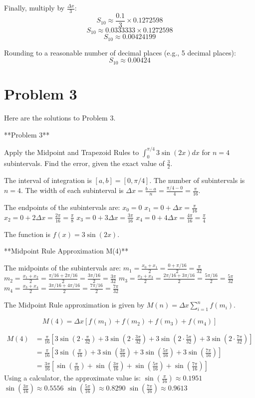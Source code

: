 \documentclass{article}
\begin{document}
Finally, multiply by $\frac{\Delta x}{3}$:
$$ S_{10} \approx \frac{0.1}{3} \times 0.1272598 $$
$$ S_{10} \approx 0.0333333 \times 0.1272598 $$
$$ S_{10} \approx 0.00424199 $$

Rounding to a reasonable number of decimal places (e.g., 5 decimal places):
$$ S_{10} \approx 0.00424 $$

\newpage

\section*{Problem 3}
Here are the solutions to Problem 3.

**Problem 3**

Apply the Midpoint and Trapezoid Rules to $\int_0^{\pi/4} 3\sin(2x) dx$ for $n=4$ subintervals. Find the error, given the exact value of $\frac{3}{2}$.

The interval of integration is $[a, b] = [0, \pi/4]$.
The number of subintervals is $n=4$.
The width of each subinterval is $\Delta x = \frac{b-a}{n} = \frac{\pi/4 - 0}{4} = \frac{\pi}{16}$.

The endpoints of the subintervals are:
$x_0 = 0$
$x_1 = 0 + \Delta x = \frac{\pi}{16}$
$x_2 = 0 + 2\Delta x = \frac{2\pi}{16} = \frac{\pi}{8}$
$x_3 = 0 + 3\Delta x = \frac{3\pi}{16}$
$x_4 = 0 + 4\Delta x = \frac{4\pi}{16} = \frac{\pi}{4}$

The function is $f(x) = 3\sin(2x)$.

**Midpoint Rule Approximation M(4)**

The midpoints of the subintervals are:
$m_1 = \frac{x_0 + x_1}{2} = \frac{0 + \pi/16}{2} = \frac{\pi}{32}$
$m_2 = \frac{x_1 + x_2}{2} = \frac{\pi/16 + 2\pi/16}{2} = \frac{3\pi/16}{2} = \frac{3\pi}{32}$
$m_3 = \frac{x_2 + x_3}{2} = \frac{2\pi/16 + 3\pi/16}{2} = \frac{5\pi/16}{2} = \frac{5\pi}{32}$
$m_4 = \frac{x_3 + x_4}{2} = \frac{3\pi/16 + 4\pi/16}{2} = \frac{7\pi/16}{2} = \frac{7\pi}{32}$

The Midpoint Rule approximation is given by $M(n) = \Delta x \sum_{i=1}^n f(m_i)$.

$$
M(4) = \Delta x [f(m_1) + f(m_2) + f(m_3) + f(m_4)]
$$

\begin{align*} M(4) &= \frac{\pi}{16} \left[ 3\sin\left(2 \cdot \frac{\pi}{32}\right) + 3\sin\left(2 \cdot \frac{3\pi}{32}\right) + 3\sin\left(2 \cdot \frac{5\pi}{32}\right) + 3\sin\left(2 \cdot \frac{7\pi}{32}\right) \right] \\ &= \frac{\pi}{16} \left[ 3\sin\left(\frac{\pi}{16}\right) + 3\sin\left(\frac{3\pi}{16}\right) + 3\sin\left(\frac{5\pi}{16}\right) + 3\sin\left(\frac{7\pi}{16}\right) \right] \\ &= \frac{3\pi}{16} \left[ \sin\left(\frac{\pi}{16}\right) + \sin\left(\frac{3\pi}{16}\right) + \sin\left(\frac{5\pi}{16}\right) + \sin\left(\frac{7\pi}{16}\right) \right]\end{align*}
Using a calculator, the approximate value is:
$\sin(\frac{\pi}{16}) \approx 0.1951$
$\sin(\frac{3\pi}{16}) \approx 0.5556$
$\sin(\frac{5\pi}{16}) \approx 0.8290$
$\sin(\frac{7\pi}{16}) \approx 0.9613$
\end{document}
